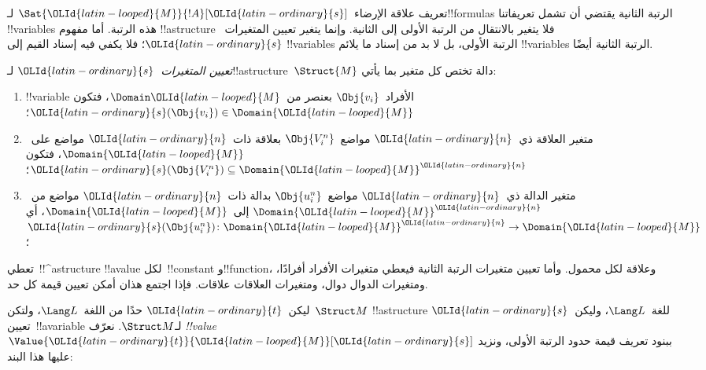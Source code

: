 \documentclass[../../../include/open-logic-section]{subfiles}
\begin{document}


\begin{explain}
تعريف علاقة الإرضاء~$\Sat{\OLId{latin-looped}{M}}{!A}[\OLId{latin-ordinary}{s}]$ لـ!!{formula}s الرتبة الثانية
يقتضي أن تشمل تعريفاتنا !!{variable}s هذه الرتبة. أما مفهوم
!!a{structure} فلا يتغير بالانتقال من الرتبة الأولى إلى الثانية.
وإنما يتغير تعيين المتغيرات~$\OLId{latin-ordinary}{s}$؛ فلا يكفي فيه إسناد القيم إلى
!!{variable}s الرتبة الأولى، بل لا بد من إسناد ما يلائم
!!{variable}s الرتبة الثانية أيضًا.
\end{explain}

\begin{defn}
\emph{تعيين المتغيرات}~$\OLId{latin-ordinary}{s}$ لـ!!a{structure}~$\Struct{M}$ دالة
تختص كل متغير بما يأتي:
\begin{enumerate}
\item !!{variable} الأفراد~$\Obj{v_i}$ بعنصر من~$\Domain \OLId{latin-looped}{M}$، فتكون
  $\OLId{latin-ordinary}{s}(\Obj{v_i}) \in \Domain{\OLId{latin-looped}{M}}$؛
\item متغير العلاقة ذي~$\OLId{latin-ordinary}{n}$ مواضع~$\Obj{V_i^n}$ بعلاقة ذات~$\OLId{latin-ordinary}{n}$
  مواضع على~$\Domain{\OLId{latin-looped}{M}}$، فتكون
  $\OLId{latin-ordinary}{s}(\Obj{V_i^n}) \subseteq \Domain{\OLId{latin-looped}{M}}^\OLId{latin-ordinary}{n}$؛
\item متغير الدالة ذي~$\OLId{latin-ordinary}{n}$ مواضع~$\Obj{u_i^n}$ بدالة ذات~$\OLId{latin-ordinary}{n}$ مواضع
  من~$\Domain{\OLId{latin-looped}{M}}^\OLId{latin-ordinary}{n}$ إلى~$\Domain{\OLId{latin-looped}{M}}$، أي
  $\OLId{latin-ordinary}{s}(\Obj{u_i^n})\colon \Domain{\OLId{latin-looped}{M}}^\OLId{latin-ordinary}{n} \to \Domain{\OLId{latin-looped}{M}}$؛
\end{enumerate}
\end{defn}

\begin{explain}
تعطي~!!^a{structure} !!a{value} لكل~!!{constant} و!!{function}،
وعلاقة لكل محمول. وأما تعيين متغيرات الرتبة الثانية فيعطي متغيرات
الأفراد أفرادًا، ومتغيرات الدوال دوال، ومتغيرات العلاقات علاقات.
فإذا اجتمع هذان أمكن تعيين قيمة كل حد.
\end{explain}

\begin{defn}
ليكن~$\OLId{latin-ordinary}{t}$ حدًا من اللغة~$\Lang L$، ولتكن~$\Struct M$
!!a{structure} للغة~$\Lang L$، وليكن~$\OLId{latin-ordinary}{s}$ تعيين~!!a{variable}
لـ$\Struct M$. نعرّف \emph{!!{value}}~$\Value{\OLId{latin-ordinary}{t}}{\OLId{latin-looped}{M}}[\OLId{latin-ordinary}{s}]$ ببنود
تعريف قيمة حدود الرتبة الأولى، ونزيد عليها هذا البند:
\begin{quote}
\end{quote}
\end{defn}
\end{document}
